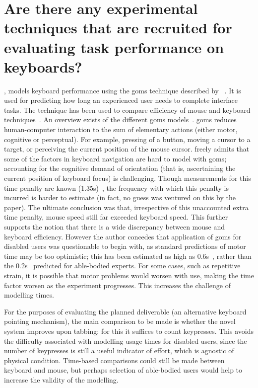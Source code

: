 \documentclass[11pt,openright,a4paper]{report}
\begin{document}
\section{Are there any experimental techniques that are recruited for evaluating task performance on keyboards?}
\citeauthor{schrepp2006efficiency}, \citeyear{schrepp2006efficiency} models keyboard performance using the \gls{goms} technique described by \citeauthor{card1983psychology}~\cite{card1983psychology}. It is used for predicting how long an experienced user needs to complete interface tasks. The technique has been used to compare efficiency of mouse and keyboard techniques~\cite{card1983psychology,john1996goms}. An overview exists of the different \gls{goms} models~\cite{john1995goms}. \gls{goms} reduces human-computer interaction to the sum of elementary actions (either motor, cognitive or perceptual). For example, pressing of a button, moving a cursor to a target, or perceiving the current position of the mouse cursor. \citeauthor{schrepp2006efficiency} freely admits that some of the factors in keyboard navigation are hard to model with \gls{goms}; accounting for the cognitive demand of orientation (that is, ascertaining the current position of keyboard focus) is challenging. Though measurements for this time penalty are known (1.35s)~\cite{raskin2000humane}, the frequency with which this penalty is incurred is harder to estimate (in fact, no guess was ventured on this by the paper). The ultimate conclusion was that, irrespective of this unaccounted extra time penalty, mouse speed still far exceeded keyboard speed. This further supports the notion that there is a wide discrepancy between mouse and keyboard efficiency. However the author concedes that application of \gls{goms} for disabled users was questionable to begin with, as standard predictions of motor time may be too optimistic; this has been estimated as high as 0.6s~\cite{keates1998developing}, rather than the 0.2s~\cite{raskin2000humane} predicted for able-bodied experts. For some cases, such as repetitive strain, it is possible that motor problems would worsen with use, making the time factor worsen as the experiment progresses. This increases the challenge of modelling times.

For the purposes of evaluating the planned deliverable (an alternative keyboard pointing mechanism), the main comparison to be made is whether the novel system improves upon tabbing; for this it suffices to count keypresses. This avoids the difficulty associated with modelling usage times for disabled users, since the number of keypresses is still a useful indicator of effort, which is agnostic of physical condition. Time-based comparisons could still be made between keyboard and mouse, but perhaps selection of able-bodied users would help to increase the validity of the modelling.
\end{document}
